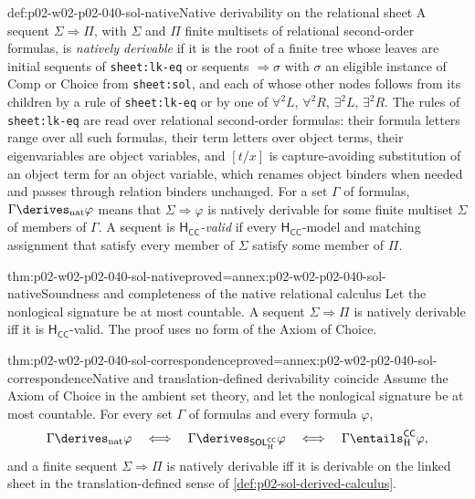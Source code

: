 \begin{hbdefinition}{def:p02-w02-p02-040-sol-native}{Native derivability on the relational sheet}
A sequent \(\Sigma\Rightarrow\Pi\), with \(\Sigma\) and \(\Pi\) finite multisets
of relational second-order formulas, is \emph{natively derivable} if it is
the root of a finite tree whose leaves are initial sequents of
\texttt{sheet:lk-eq} or sequents
\(\Rightarrow\sigma\) with \(\sigma\) an eligible instance of Comp or Choice
from \texttt{sheet:sol}, and each of whose other nodes
follows from its children by a rule of \texttt{sheet:lk-eq} or by one of
\(\forall^2L\), \(\forall^2R\), \(\exists^2L\), \(\exists^2R\).  The rules of
\texttt{sheet:lk-eq} are read over relational second-order formulas: their
formula letters range over all such formulas, their term letters over
object terms, their eigenvariables are object variables, and \([t/x]\) is
capture-avoiding substitution of an object term for an object variable,
which renames object binders when needed and passes through relation
binders unchanged.  For a set \(\Gamma\) of formulas,
\(\Gamma\derives_{\mathrm{nat}}\varphi\) means that \(\Sigma\Rightarrow\varphi\) is
natively derivable for some finite multiset \(\Sigma\) of members of
\(\Gamma\).  A sequent is \emph{\(\mathsf H_{\mathsf{CC}}\)-valid} if every
\(\mathsf H_{\mathsf{CC}}\)-model and matching assignment that satisfy every
member of \(\Sigma\) satisfy some member of \(\Pi\).
\end{hbdefinition}

\begin{hbtheorem}{thm:p02-w02-p02-040-sol-native}{proved=annex:p02-w02-p02-040-sol-native}{Soundness and completeness of the native relational calculus}
Let the nonlogical signature be at most countable.  A sequent
\(\Sigma\Rightarrow\Pi\) is natively derivable iff it is
\(\mathsf H_{\mathsf{CC}}\)-valid.  The proof uses no form of the Axiom of
Choice.
\end{hbtheorem}

\begin{hbcorollary}{thm:p02-w02-p02-040-sol-correspondence}{proved=annex:p02-w02-p02-040-sol-correspondence}{Native and translation-defined derivability coincide}
Assume the Axiom of Choice in the ambient set theory, and let the
nonlogical signature be at most countable.  For every set \(\Gamma\) of
formulas and every formula \(\varphi\),
\[
 \Gamma\derives_{\mathrm{nat}}\varphi
 \quad\Longleftrightarrow\quad
 \Gamma\derives_{\mathsf{SOL}_{\mathrm H}^{\mathsf{CC}}}\varphi
 \quad\Longleftrightarrow\quad
 \Gamma\entails_{\mathrm H}^{\mathsf{CC}}\varphi ,
\]
and a finite sequent \(\Sigma\Rightarrow\Pi\) is natively derivable iff it is
derivable on the linked sheet in the translation-defined sense of
\cref{def:p02-sol-derived-calculus}.
\end{hbcorollary}

